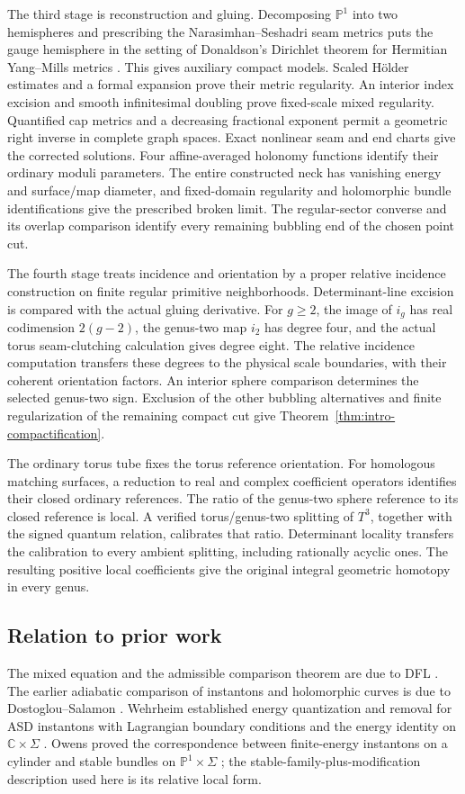 \documentclass[11pt]{amsart}
\theoremstyle{definition}
\theoremstyle{remark}
\theoremstyle{plain}
\newcommand{\CC}{\mathbb{C}}
\newcommand{\PP}{\mathbb{P}}
\begin{document}
The third stage is reconstruction and gluing.  Decomposing $\PP^1$ into
two hemispheres and prescribing the Narasimhan--Seshadri seam metrics puts
the gauge hemisphere in the setting of Donaldson's Dirichlet theorem for
Hermitian Yang--Mills metrics \cite{Donaldson92}. This gives auxiliary
compact models. Scaled H\"older estimates and a formal expansion prove
their metric regularity. An interior index excision and smooth
infinitesimal doubling prove fixed-scale mixed regularity. Quantified
cap metrics and a decreasing fractional exponent permit a geometric
right inverse in complete graph spaces. Exact nonlinear seam and end
charts give the corrected solutions. Four affine-averaged holonomy
functions identify their ordinary moduli parameters. The entire constructed
neck has vanishing energy and surface/map diameter, and fixed-domain
regularity and holomorphic bundle identifications give the prescribed
broken limit. The regular-sector converse and its overlap comparison
identify every remaining bubbling end of the chosen point cut.

The fourth stage treats incidence and orientation by a proper relative
incidence construction on finite regular primitive neighborhoods.
Determinant-line excision is compared with the actual gluing derivative.
For $g\geq2$, the image of $i_g$ has real codimension $2(g-2)$, the
genus-two map $i_2$ has degree four, and the actual
torus seam-clutching calculation gives degree eight.
The relative incidence computation transfers these degrees to
the physical scale boundaries, with their coherent orientation factors.
An interior sphere comparison determines the selected genus-two sign.
Exclusion of the other bubbling alternatives and finite regularization
of the remaining compact cut give
Theorem~\ref{thm:intro-compactification}.

The ordinary torus tube fixes the torus reference orientation.
For homologous matching surfaces, a reduction to real and
complex coefficient operators identifies their closed ordinary
references. The ratio of the genus-two sphere reference to its
closed reference is local. A verified torus/genus-two splitting
of $T^3$, together with the signed quantum relation, calibrates
that ratio. Determinant locality transfers the calibration to
every ambient splitting, including rationally acyclic ones.
The resulting positive local coefficients give the original
integral geometric homotopy in every genus.

\subsection{Relation to prior work}
The mixed equation and the admissible comparison theorem are due to DFL
\cite{DaeFukLip21a,DaeFukLip21b}.  The earlier adiabatic comparison of
instantons and holomorphic curves is due to Dostoglou--Salamon
\cite{DosSal94,DosSal07}.  Wehrheim established energy quantization and
removal for ASD instantons with Lagrangian boundary conditions
\cite{Wehrheim05a} and the energy identity on $\CC\times\Sigma$
\cite{Wehrheim05b}.  Owens proved the correspondence between finite-energy
instantons on a cylinder and stable bundles on $\PP^1\times\Sigma$
\cite{Owens01}; the stable-family-plus-modification description used here
is its relative local form.
\end{document}
